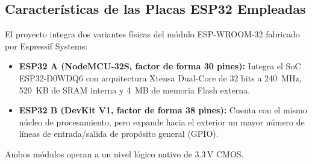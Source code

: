 \documentclass[11pt,a4paper]{article}
\begin{document}
\subsection{Características de las Placas ESP32 Empleadas}
El proyecto integra dos variantes físicas del módulo ESP-WROOM-32 fabricado por Espressif Systems:
\begin{itemize}
    \item \textbf{ESP32 A (NodeMCU-32S, factor de forma 30 pines):} Integra el SoC ESP32-D0WDQ6 con arquitectura Xtensa Dual-Core de 32 bits a 240~MHz, 520~KB de SRAM interna y 4~MB de memoria Flash externa.
    \item \textbf{ESP32 B (DevKit V1, factor de forma 38 pines):} Cuenta con el mismo núcleo de procesamiento, pero expande hacia el exterior un mayor número de líneas de entrada/salida de propósito general (GPIO).
\end{itemize}

Ambos módulos operan a un nivel lógico nativo de $3.3\,\text{V}$ CMOS.
\end{document}
